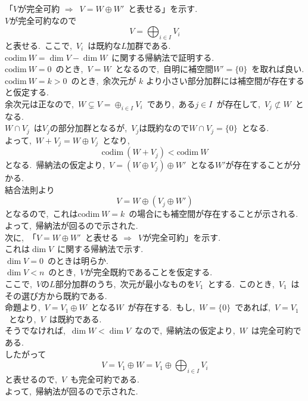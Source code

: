 \documentclass[uplatex,dvipdfmx]{jsarticle}
\begin{document}
\begin{myproof}
    「$V$が完全可約 $\Longrightarrow$~$V=W\oplus W'$~と表せる」を示す.\\
    $V$が完全可約なので
    \begin{equation*}
        V=\bigoplus_{i\in I} V_i
    \end{equation*}
    と表せる.~ここで,~$V_i$~は既約な$L$加群である.\\
    $\text{codim}~W=\dim V -\dim W$~に関する帰納法で証明する.\\
    $\text{codim}~W=0$~のとき,~$V=W$~となるので,~自明に補空間$W'=\{0\}$~を取れば良い.\\
    $\text{codim}~W=k>0$~のとき,~余次元が $k$ より小さい部分加群には補空間が存在すると仮定する.\\
    余次元は正なので,~$W\subsetneq V=\oplus_{i\in I} V_i$~であり,~ある$j\in I$~が存在して,~$V_j \not\subset W$~となる.\\
    $W\cap V_j$~は$V_j$の部分加群となるが,~$V_j$は既約なので$W\cap V_j=\{0\}$~となる.\\
    よって,~$W + V_j=W\oplus V_j$~となり,
    \begin{equation*}
        \text{codim}~(W + V_j) < \text{codim}~W
    \end{equation*}
    となる.~帰納法の仮定より,~$V = (W \oplus V_j)\oplus W'$~となる$W'$が存在することが分かる.\\
    結合法則より
    \begin{equation*}
        V=W\oplus (V_j \oplus W')
    \end{equation*}
    となるので,~これは$\text{codim}~W = k$~の場合にも補空間が存在することが示される.\\
    よって,~帰納法が回るので示された.\\
    次に,~「$V=W\oplus W'$~と表せる $\Longrightarrow$~$V$が完全可約」を示す.\\
    これは$\dim V$~に関する帰納法で示す.\\
    $\dim V=0$~のときは明らか.\\
    $\dim V < n$~のとき,~$V$が完全既約であることを仮定する.\\
    ここで,~$V$の$L$部分加群のうち,~次元が最小なものを$V_1$~とする.~このとき,~$V_1$~はその選び方から既約である.\\
    命題より,~$V=V_1 \oplus W$~となる$W$~が存在する.~もし,~$W=\{0\}$~であれば,~$V=V_1$~となり,~$V$~は既約である.\\
    そうでなければ,~$\dim W < \dim V$~なので,~帰納法の仮定より,~$W$~は完全可約である.\\
    したがって
    \begin{equation*}
        V=V_1 \oplus W = V_1 \oplus \bigoplus_{i\in I} V_i
    \end{equation*}
    と表せるので,~$V$~も完全可約である.\\
    よって,~帰納法が回るので示された.
\end{myproof}
\end{document}
